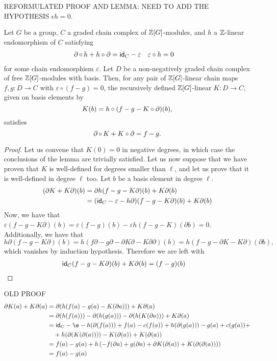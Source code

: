 \noindent REFORMULATED PROOF AND LEMMA: NEED TO ADD THE HYPOTHESIS $\epsilon h =0$.

\begin{lemma}
	Let $G$ be a group, $C$ a graded chain complex of $\mathbb{Z}[G]$-modules, and $h$ a $\mathbb{Z}$-linear endomorphism of $C$ satisfying
	\begin{align*}
	\operatorname{\partial} \circ \, h + h \circ \operatorname{\partial} &= \mathsf{id}_C - \varepsilon
    &
    \varepsilon\circ h &= 0
	\end{align*}
	for some chain endomorphism $\varepsilon$. Let $D$ be a non-negatively graded chain complex of free $\mathbb{Z}[G]$-modules with basis.
	Then, for any pair of $\mathbb{Z}[G]$-linear chain maps $f,g \colon D \to C$ with $\varepsilon \circ (f-g) = 0$, the recursively defined $\mathbb{Z}[G]$-linear $K \colon D \to C$, given on basis elements by
	\[
	K(b) = h \circ (f - g - K \circ \operatorname{\partial})(b),
	\]
	satisfies
	\[
	\operatorname{\partial} \circ \, K + K \circ \operatorname{\partial} = f - g.
	\]
\end{lemma}

\begin{proof} Let us convene that $K(0) = 0$ in negative degrees, in which case the conclusions of the lemma are trivially satisfied. Let us now suppose that we have proven that $K$ is well-defined for degrees smaller than $\ell$, and let us prove that it is well-defined in degree $\ell$ too. Let $b$ be a basis element in degree $\ell$.
\begin{align*}
    (\partial K+ K\partial)(b)
    &= \partial h(f-g-K\partial)(b) + K\partial(b) \\
    &= (\mathsf{id}_C-\varepsilon-h\partial)(f-g-K\partial)(b)+K\partial(b)
\end{align*}
Now, we have that $\varepsilon(f-g-K\partial)(b) = \varepsilon(f-g)(b) - \varepsilon h(f-g-K)(\partial b) = 0$. Additionally, we have that 
\[h\partial (f-g-K\partial)(b) = h(f\partial-g\partial-\partial K\partial - K\partial\partial)(b) = h(f-g-\partial K - K\partial)(\partial b),
\] 
which vanishes by induction hypothesis. Therefore we are left with
\begin{align*}
    \mathsf{id}_C(f-g-K\partial)(b)+K\partial(b) &= (f-g)(b) \qedhere
\end{align*}
\end{proof}

\noindent OLD PROOF
\begin{align*}
	\partial K(a) + K\partial(a)
	&= \partial(h(f(a)-g(a)-K(\partial a))) + K\partial(a) \\
	&= \partial(h(f(a)))-\partial(h(g(a)))-\partial(h(K(\partial a))) + K\partial(a) \\
	&= \id_C-\e
 -h(\partial(f(a))) + f(a) -c(f(a))+ h(\partial(g(a))) - g(a)+c(g(a))  + \\
	&\quad + h(\partial(K(\partial(a)))) - K(\partial(a)) + K(\partial(a)) \\
	&= f(a) - g(a) + h\left(-f(\partial a) + g(\partial a) + \partial K(\partial(a)) + K(\partial(\partial(a)))\right) \\
	&= f(a) - g(a)
\end{align*}

